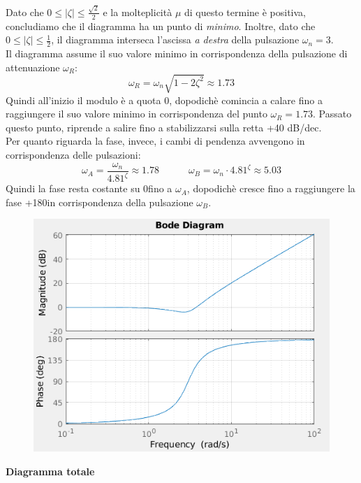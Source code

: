 \documentclass[12pt,a4paper]{article}
\begin{document}
\begin{itemize}
\begin{itemize}
		\end{itemize}
		Dato che $0 \leq |\zeta| \leq \frac{\sqrt{2}}{2}$ e la molteplicit\`a $\mu$ di questo termine \`e positiva, concludiamo che il diagramma ha un punto di \textit{minimo}. Inoltre, dato che $0 \leq |\zeta| \leq \frac{1}{2}$, il diagramma interseca l'ascissa \textit{a destra} della pulsazione $\omega_n = 3$.\\
		Il diagramma assume il suo valore minimo in corrispondenza della pulsazione di attenuazione $\omega_R$:
		\[
			\omega_R = \omega_n\sqrt{1-2\zeta^2} \approx 1.73
		\]
		Quindi all'inizio il modulo \`e a quota 0, dopodich\`e comincia a calare fino a raggiungere il suo valore minimo in corrispondenza del punto $\omega_R = 1.73$. Passato questo punto, riprende a salire fino a stabilizzarsi sulla retta +40 dB/dec.\\
		Per quanto riguarda la fase, invece, i cambi di pendenza avvengono in corrispondenza delle pulsazioni:
		\[
			\omega_A = \frac{\omega_n}{4.81^\zeta} \approx 1.78\quad\quad\quad\omega_B = \omega_n \cdot 4.81^\zeta \approx 5.03
		\]
		Quindi la fase resta costante su 0\degree fino a $\omega_A$, dopodich\`e cresce fino a raggiungere la fase +180\degree in corrispondenza della pulsazione $\omega_B$.\\
		\begin{figure}[h!]
			\centering
			\includegraphics[scale=0.5]{./images/bode45_4.png}
		\end{figure}
	\end{itemize}
	\newpage
	\textbf{Diagramma totale}
\end{document}
